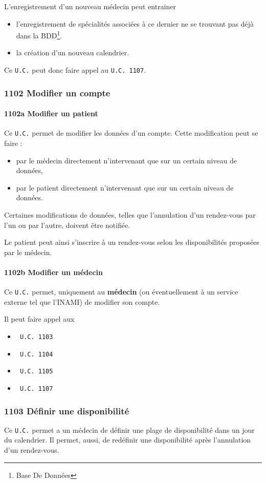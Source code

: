 L'enregistrement d'un nouveau médecin peut entrainer 
\begin{itemize}
	\item l'enregistrement de	spécialités associées à ce dernier ne se trouvant pas déjà dans la 
		BDD\footnote{Base De Données}.
	\item la création d'un nouveau calendrier.
\end{itemize}
Ce \texttt{U.C.} peut donc faire appel au \texttt{U.C. 1107}.
\subsubsection{1102 Modifier un compte}

\paragraph{1102a Modifier un patient}
Ce \texttt{U.C.} permet de modifier les données d'un compte. Cette modification
peut se faire :
\begin{itemize}
	\item par le médecin directement n'intervenant que sur un certain niveau de
		données,
	\item par le patient directement n'intervenant que sur un certain niveau de
		données.
\end{itemize}

Certaines modifications de données, telles que l'annulation d'un rendez-vous par
l'un ou par l'autre, doivent être notifiée.

Le patient peut ainsi s'inscrire à un rendez-vous selon les disponibilités
proposées par le médecin.
\paragraph{1102b Modifier un médecin}
Ce \texttt{U.C.} permet, uniquement au \textbf{médecin} (ou éventuellement à un
service externe tel que l'INAMI) de modifier son compte.

Il peut faire appel aux 
\begin{itemize}
	\item \texttt{~U.C. 1103} 
	\item \texttt{~U.C. 1104} 
	\item \texttt{~U.C. 1105}
	\item \texttt{~U.C. 1107}
\end{itemize}

\subsubsection{\label{1103}1103 Définir une disponibilité}
Ce \texttt{U.C.} permet a un médecin de définir une plage de disponibilité dans
un jour du calendrier. Il permet, aussi, de redéfinir une disponibilité après
l'annulation d'un rendez-vous.
